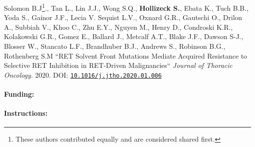 {Solomon B.J\footnote{These authors contributed equally and are considered shared first.}., Tan L.\footnotemark[\value{footnote}], Lin J.J.\footnotemark[\value{footnote}], Wong S.Q.\footnotemark[\value{footnote}], \textbf{Hollizeck S.}\footnotemark[\value{footnote}], Ebata K., Tuch B.B., Yoda S., Gainor J.F., Lecia V. Sequist L.V., Oxnard G.R., Gautschi O., Drilon A., Subbiah V., Khoo C., Zhu E.Y., Nguyen M., Henry D., Condroski K.R., Kolakowski G.R., Gomez E., Ballard J., Metcalf A.T., Blake J.F., Dawson S-J., Blosser W., Stancato L.F., Brandhuber B.J., Andrews S., Robinson B.G., Rothenberg S.M
``RET Solvent Front Mutations Mediate Acquired Resistance to Selective RET Inhibition in RET-Driven Malignancies``
\textit{Journal of Thoracic Oncology.} 2020. DOI: \href{https://doi.org/10.1016/j.jtho.2020.01.006}{\nolinkurl{10.1016/j.jtho.2020.01.006}}


\paragraph{Funding:}  


\hrulefill

\paragraph{Instructions:}

}
